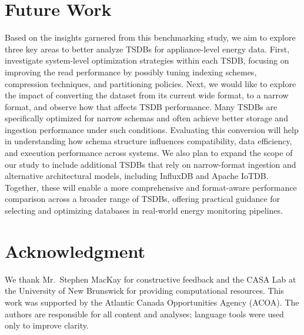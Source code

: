 \documentclass[conference]{IEEEtran}
\begin{document}
\section{Future Work}\label{sec:future}
Based on the insights garnered from this benchmarking study, we aim to explore three key areas to better analyze TSDBs for appliance-level energy data. 
First, investigate system-level optimization strategies within each TSDB, focusing on improving the read performance by possibly tuning indexing schemes, compression techniques, and partitioning policies. 
Next, we would like to explore the impact of converting the dataset from its current wide format, to a narrow format, and observe how that affects TSDB performance. Many TSDBs are specifically optimized for narrow schemas and often achieve better storage and ingestion performance under such conditions. Evaluating this conversion will help in understanding how schema structure influences compatibility, data efficiency, and execution performance across systems.
We also plan to expand the scope of our study to include additional TSDBs that rely on narrow-format ingestion and alternative architectural models, including InfluxDB and Apache IoTDB\@. Together, these will enable a more comprehensive and format-aware performance comparison across a broader range of TSDBs, offering practical guidance for selecting and optimizing databases in real-world energy monitoring pipelines.

\section*{Acknowledgment}
We thank Mr.~Stephen MacKay for constructive feedback and the CASA Lab at the University of New Brunswick for providing computational resources. This work was supported by the Atlantic Canada Opportunities Agency (ACOA). The authors are responsible for all content and analyses; language tools were used only to improve clarity.
\end{document}
